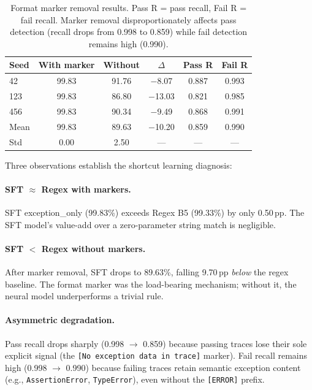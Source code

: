 \documentclass[11pt,a4paper]{article}
\newcommand{\pp}{\,\text{pp}}
\newcommand{\eg}{e.g.}
\begin{document}
\begin{table}[t]
\centering
\small
\begin{tabular}{lccccc}
\toprule
\textbf{Seed} & \textbf{With marker} & \textbf{Without} & \textbf{$\Delta$} & \textbf{Pass R} & \textbf{Fail R} \\
\midrule
42  & 99.83 & 91.76 & $-$8.07 & 0.887 & 0.993 \\
123 & 99.83 & 86.80 & $-$13.03 & 0.821 & 0.985 \\
456 & 99.83 & 90.34 & $-$9.49 & 0.868 & 0.991 \\
\midrule
Mean & 99.83 & 89.63 & $-$10.20 & 0.859 & 0.990 \\
Std  & 0.00  & 2.50  & --- & --- & --- \\
\bottomrule
\end{tabular}
\caption{Format marker removal results. Pass R = pass recall, Fail R = fail recall. Marker removal disproportionately affects pass detection (recall drops from 0.998 to 0.859) while fail detection remains high (0.990).}
\label{tab:nomarker}
\end{table}

Three observations establish the shortcut learning diagnosis:

\paragraph{SFT $\approx$ Regex with markers.}
SFT exception\_only (99.83\%) exceeds Regex B5 (99.33\%) by only 0.50$\pp$.
The SFT model's value-add over a zero-parameter string match is negligible.

\paragraph{SFT $<$ Regex without markers.}
After marker removal, SFT drops to 89.63\%, falling 9.70$\pp$ \emph{below} the regex baseline.
The format marker was the load-bearing mechanism; without it, the neural model underperforms a trivial rule.

\paragraph{Asymmetric degradation.}
Pass recall drops sharply (0.998 $\to$ 0.859) because passing traces lose their sole explicit signal (the \texttt{[No exception data in trace]} marker).
Fail recall remains high (0.998 $\to$ 0.990) because failing traces retain semantic exception content (\eg, \texttt{AssertionError}, \texttt{TypeError}), even without the \texttt{[ERROR]} prefix.
\end{document}
